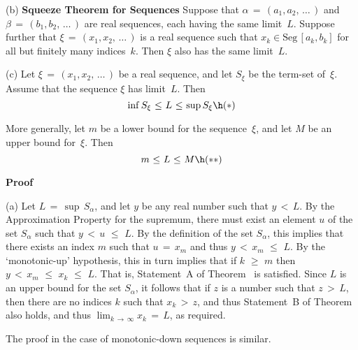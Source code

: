 \V

        (b) {\bf Squeeze Theorem for Sequences}
    Suppose that ${\alpha} \,=\, (a_{1},a_{2},\,{\ldots}\,)$ and ${\beta} \,=\, (b_{1},b_{2},\,{\ldots}\,)$
    are real sequences, each having the same limit~$L$. Suppose further that ${\xi} \,=\, (x_{1},x_{2},\,{\ldots}\,)$ is a real sequence such that 
    $x_{k}{\in}\mbox{Seg}\,[a_{k},b_{k}]$ for all but finitely many indices~$k$. Then ${\xi}$ also has the same limit~$L$.

\V

        (c) Let ${\xi} \,=\, (x_{1},x_{2},\,{\ldots}\,)$ be a real sequence, and let $S_{{\xi}}$ be the term-set of~${\xi}$.
    Assume that the sequence ${\xi}$ has limit~$L$. Then
        \begin{displaymath}
        {\inf}\,S_{{\xi}}\,\,{\leq}\,\,L\,\,{\leq}\,\,{\sup}\,S_{{\xi}} \h ({\ast})
        \end{displaymath}

        More generally, let $m$ be a lower bound for the sequence~${\xi}$, and let $M$ be an upper bound for~${\xi}$. Then
        \begin{displaymath}
        m\,\,{\leq}\,\,L\,\,{\leq}\,\,M \h ({\ast}{\ast})
        \end{displaymath}

\V

        {\bf Proof}
\V

        (a) Let $L \,=\, {\sup}\,S_{{\alpha}}$, and let $y$ be any real number such that $y\,<\,L$.
    By the Approximation Property for the supremum, there must exist an element $u$ of the set $S_{{\alpha}}$ such that $y\,<\,u\,\,{\leq}\,\,L$.
   By the definition of the set $S_{{\alpha}}$, this implies that there exists an index $m$ such that $u \,=\, x_{m}$ and thus $y\,<\,x_{m}\,\,{\leq}\,\,L$.
    By the `monotonic-up' hypothesis, this in turn implies that if $k\,\,{\geq}\,\,m$ then $y\,<\,x_{m}\,\,{\leq}\,\,x_{k}\,\,{\leq}\,\,L$.
    That is, Statement~A of Theorem~ is satisfied. Since $L$ is an upper bound for the set $S_{{\alpha}}$,
    it follows that if $z$ is a number such that $z\,>\,L$, then there are no indices $k$ such that $x_{k}\,>\,z$, and thus Statement~B of Theorem~ also holds,
    and thus $\lim_{k \,{\rightarrow}\, {\infty}} x_{k} \,=\, L$, as required.

        The proof in the case of monotonic-down sequences is similar.

\V

